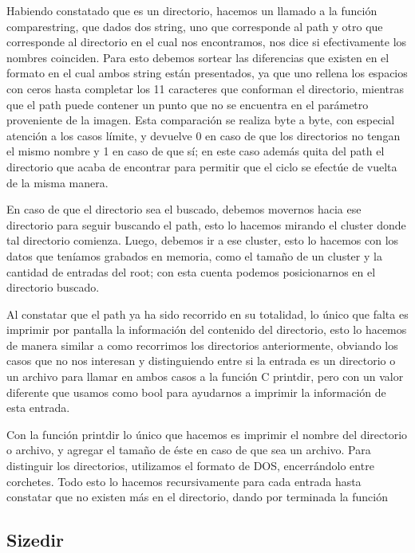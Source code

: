 \documentclass[a4paper,10pt]{article}
\begin{document}
Habiendo constatado que es un directorio, hacemos un llamado a la función comparestring, que dados dos string, uno que corresponde al path y otro que corresponde al directorio en el cual nos encontramos, nos dice si efectivamente los nombres coinciden. Para esto debemos sortear las diferencias que existen en el formato en el cual ambos string están presentados, ya que uno rellena los espacios con ceros hasta completar los 11 caracteres que conforman el directorio, mientras que el path puede contener un punto que no se encuentra en el parámetro proveniente de la imagen. Esta comparación se realiza byte a byte, con especial atención a los casos límite, y devuelve 0 en caso de que los directorios no tengan el mismo nombre y 1 en caso de que sí; en este caso además quita del path el directorio que acaba de encontrar para permitir que el ciclo se efectúe de vuelta de la misma manera.

En caso de que el directorio sea el buscado, debemos movernos hacia ese directorio para seguir buscando el path, esto lo hacemos mirando el cluster donde tal directorio comienza. Luego, debemos ir a ese cluster, esto lo hacemos con los datos que teníamos grabados en memoria, como el tamaño de un cluster y la cantidad de entradas del root; con esta cuenta podemos posicionarnos en el directorio buscado.

Al constatar que el path ya ha sido recorrido en su totalidad, lo único que falta es imprimir por pantalla la información del contenido del directorio, esto lo hacemos de manera similar a como recorrimos los directorios anteriormente, obviando los casos que no nos interesan y distinguiendo entre si la entrada es un directorio o un archivo para llamar en ambos casos a la función C printdir, pero con un valor diferente que usamos como bool para ayudarnos a imprimir la información de esta entrada. 

Con la función printdir lo único que hacemos es imprimir el nombre del directorio o archivo, y agregar el tamaño de éste en caso de que sea un archivo. Para distinguir los directorios, utilizamos el formato de DOS, encerrándolo entre corchetes. Todo esto lo hacemos recursivamente para cada entrada hasta constatar que no existen más en el directorio, dando por terminada la función

\subsection{Sizedir}
\end{document}
